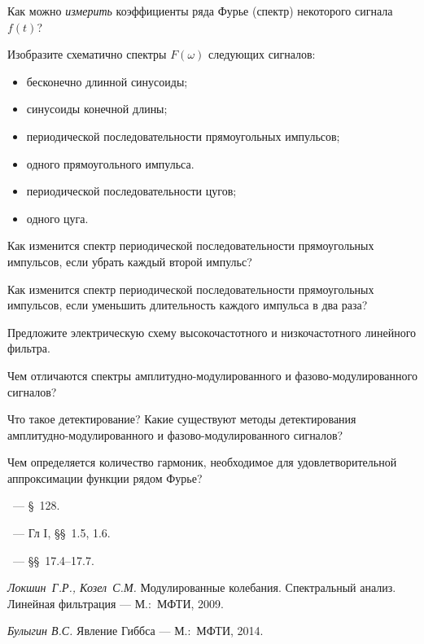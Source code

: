 \begin{lab:questions}
\item Как можно \emph{измерить} коэффициенты ряда Фурье (спектр) некоторого сигнала
$f(t)$?

\item Изобразите схематично спектры $F(\omega)$ следующих сигналов:
\begin{itemize}
    \item бесконечно длинной синусоиды;
    \item синусоиды конечной длины;
    \item периодической последовательности прямоугольных импульсов;
    \item одного прямоугольного импульса.
    \item периодической последовательности цугов;
    \item одного цуга.
\end{itemize}

\item Как изменится спектр периодической последовательности
прямоугольных импульсов, если убрать каждый второй импульс?

\item Как изменится спектр периодической последовательности прямоугольных
импульсов, если уменьшить длительность каждого импульса в два раза?

\item Предложите электрическую схему высокочастотного и 
низкочастотного линейного фильтра.

\item Чем отличаются спектры амплитудно-модулированного 
и фазово-модулированного сигналов?

\item Что такое детектирование? Какие существуют методы детектирования
амплитудно-модулированного и фазово-модулированного сигналов?

\item Чем определяется количество гармоник, необходимое для удовлетворительной 
аппроксимации функции рядом Фурье?
\end{lab:questions}


\begin{lab:literature}
    \item \SivuhinIII~--- \S~128.
    \item \KingLokOlh~--- Гл I, \S\S~1.5, 1.6.
    \item \Kirichenko~--- \S\S~17.4--17.7.
    \item \textit{Локшин~Г.Р., Козел~С.М.} Модулированные колебания. Спектральный
анализ. Линейная фильтрация --- М.:~МФТИ, 2009.
\item *\textit{Булыгин В.С.} Явление Гиббса --- М.:~МФТИ, 2014.
\end{lab:literature}




